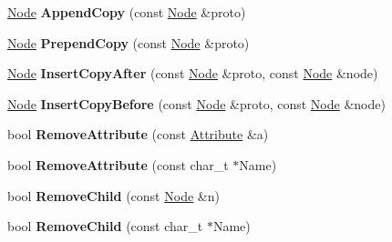 \begin{DoxyCompactItemize}
\item 
\hypertarget{classphys_1_1xml_1_1Node_a8b7872e4baf76dd5d19aa4f8d2b1a44d}{
\hyperlink{classphys_1_1xml_1_1Node}{Node} {\bfseries AppendCopy} (const \hyperlink{classphys_1_1xml_1_1Node}{Node} \&proto)}
\label{d7/d0a/classphys_1_1xml_1_1Node_a8b7872e4baf76dd5d19aa4f8d2b1a44d}

\item 
\hypertarget{classphys_1_1xml_1_1Node_a39b55aafd5a79bcd8dc5fdaed1a0ef10}{
\hyperlink{classphys_1_1xml_1_1Node}{Node} {\bfseries PrependCopy} (const \hyperlink{classphys_1_1xml_1_1Node}{Node} \&proto)}
\label{d7/d0a/classphys_1_1xml_1_1Node_a39b55aafd5a79bcd8dc5fdaed1a0ef10}

\item 
\hypertarget{classphys_1_1xml_1_1Node_a335c643bed6d4527191234fa773450e4}{
\hyperlink{classphys_1_1xml_1_1Node}{Node} {\bfseries InsertCopyAfter} (const \hyperlink{classphys_1_1xml_1_1Node}{Node} \&proto, const \hyperlink{classphys_1_1xml_1_1Node}{Node} \&node)}
\label{d7/d0a/classphys_1_1xml_1_1Node_a335c643bed6d4527191234fa773450e4}

\item 
\hypertarget{classphys_1_1xml_1_1Node_a97aec2d259e46d180ef1cde6554b0b73}{
\hyperlink{classphys_1_1xml_1_1Node}{Node} {\bfseries InsertCopyBefore} (const \hyperlink{classphys_1_1xml_1_1Node}{Node} \&proto, const \hyperlink{classphys_1_1xml_1_1Node}{Node} \&node)}
\label{d7/d0a/classphys_1_1xml_1_1Node_a97aec2d259e46d180ef1cde6554b0b73}

\item 
\hypertarget{classphys_1_1xml_1_1Node_a4611b91862503e51f126fb408d6d5fd7}{
bool {\bfseries RemoveAttribute} (const \hyperlink{classphys_1_1xml_1_1Attribute}{Attribute} \&a)}
\label{d7/d0a/classphys_1_1xml_1_1Node_a4611b91862503e51f126fb408d6d5fd7}

\item 
\hypertarget{classphys_1_1xml_1_1Node_a828dafc91ac62c7807ee50172e682110}{
bool {\bfseries RemoveAttribute} (const char\_\-t $\ast$Name)}
\label{d7/d0a/classphys_1_1xml_1_1Node_a828dafc91ac62c7807ee50172e682110}

\item 
\hypertarget{classphys_1_1xml_1_1Node_abc7bc53ad28bc879248603708811f2f6}{
bool {\bfseries RemoveChild} (const \hyperlink{classphys_1_1xml_1_1Node}{Node} \&n)}
\label{d7/d0a/classphys_1_1xml_1_1Node_abc7bc53ad28bc879248603708811f2f6}

\item 
\hypertarget{classphys_1_1xml_1_1Node_a2612e301caa54ac6af135b8fb11b2e25}{
bool {\bfseries RemoveChild} (const char\_\-t $\ast$Name)}
\label{d7/d0a/classphys_1_1xml_1_1Node_a2612e301caa54ac6af135b8fb11b2e25}


\end{DoxyCompactItemize}
